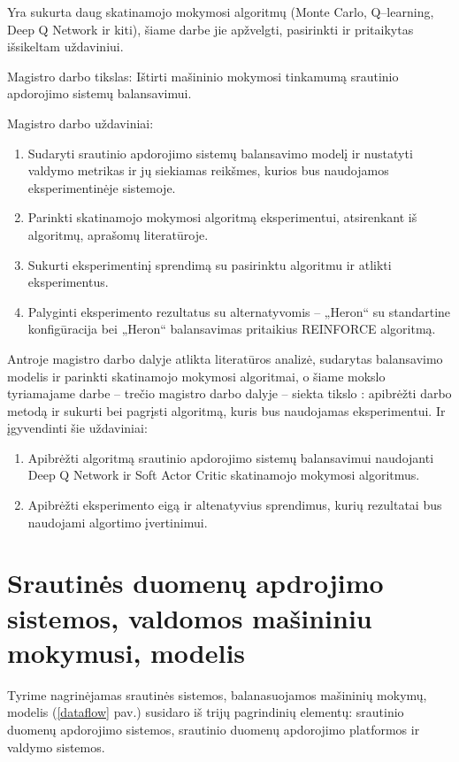 \documentclass{VUMIFPSbakalaurinis}
\begin{document}
Yra sukurta daug skatinamojo mokymosi algoritmų (Monte Carlo, Q–learning, Deep Q Network ir kiti), šiame darbe jie apžvelgti, pasirinkti ir pritaikytas išsikeltam uždaviniui. 

Magistro darbo tikslas: Ištirti mašininio mokymosi tinkamumą srautinio apdorojimo sistemų balansavimui. 

Magistro darbo uždaviniai:
\begin{enumerate}
    \item Sudaryti srautinio apdorojimo sistemų balansavimo modelį ir nustatyti valdymo metrikas ir jų siekiamas reikšmes, kurios bus naudojamos eksperimentinėje sistemoje.
    \item Parinkti skatinamojo mokymosi algoritmą eksperimentui, atsirenkant iš algoritmų, aprašomų literatūroje.
    \item Sukurti eksperimentinį sprendimą su pasirinktu algoritmu ir atlikti eksperimentus.
    \item Palyginti eksperimento rezultatus su alternatyvomis – „Heron“ su standartine konfigūracija bei „Heron“ balansavimas pritaikius REINFORCE algoritmą. 
\end{enumerate}
Antroje magistro darbo dalyje atlikta literatūros analizė, sudarytas balansavimo modelis ir parinkti skatinamojo mokymosi algoritmai, o šiame mokslo tyriamajame darbe – trečio magistro darbo dalyje – siekta tikslo : apibrėžti darbo metodą ir sukurti bei pagrįsti algoritmą, kuris bus naudojamas eksperimentui. Ir įgyvendinti šie uždaviniai:
\begin{enumerate}
    \item Apibrėžti algoritmą srautinio apdorojimo sistemų balansavimui naudojanti Deep Q Network ir Soft Actor Critic skatinamojo mokymosi algoritmus.
    \item Apibrėžti eksperimento eigą ir altenatyvius sprendimus, kurių rezultatai bus naudojami algortimo įvertinimui. 
\end{enumerate}

\section{Srautinės duomenų apdrojimo sistemos, valdomos mašininiu mokymusi, modelis}

Tyrime nagrinėjamas srautinės sistemos, balanasuojamos mašininių mokymų, modelis (\ref{dataflow} pav.) susidaro iš trijų pagrindinių elementų: srautinio duomenų apdorojimo sistemos, srautinio duomenų apdorojimo platformos ir valdymo sistemos. 
\end{document}
